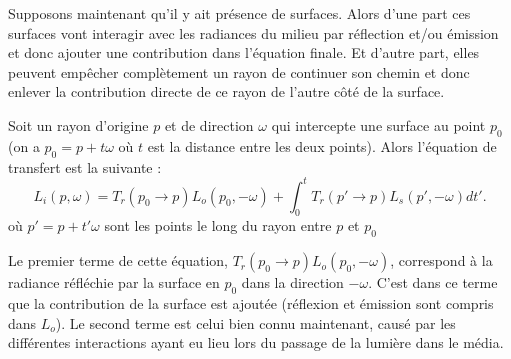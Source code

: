 Supposons maintenant qu'il y ait présence de surfaces. Alors d'une part ces surfaces vont interagir avec les radiances du milieu par réflection et/ou émission et donc ajouter une contribution dans l'équation finale. Et d'autre part, elles peuvent empêcher complètement un rayon de continuer son chemin et donc enlever la contribution directe de ce rayon de l'autre côté de la surface.\par
Soit un rayon d'origine $p$ et de direction $\omega$ qui intercepte une surface au point $p_{0}$ (on a $p_{0} = p + t\omega$ où $t$ est la distance entre les deux points). Alors l'équation de transfert est la suivante :
\large \begin{equation} \label{eq:equation_of_transfert}
L_{i}(p, \omega) = T_{r}(p_{0}\longrightarrow p)L_{o}(p_{0}, -\omega) + \int_{0}^{t} T_{r}(p'\longrightarrow p)L_s(p', -\omega) dt'.
\end{equation} \normalsize
où $p' = p + t'\omega$ sont les points le long du rayon entre $p$ et $p_{0}$\par
Le premier terme de cette équation,  $T_{r}(p_{0}\longrightarrow p)L_{o}(p_{0}, -\omega)$,  correspond à la radiance réfléchie par la surface en $p_{0}$ dans la direction $-\omega$. C'est dans ce terme que la contribution de la surface est ajoutée (réflexion et émission sont compris dans $L_{o}$). Le second terme est celui bien connu maintenant, causé par les différentes interactions ayant eu lieu lors du passage de la lumière dans le média.